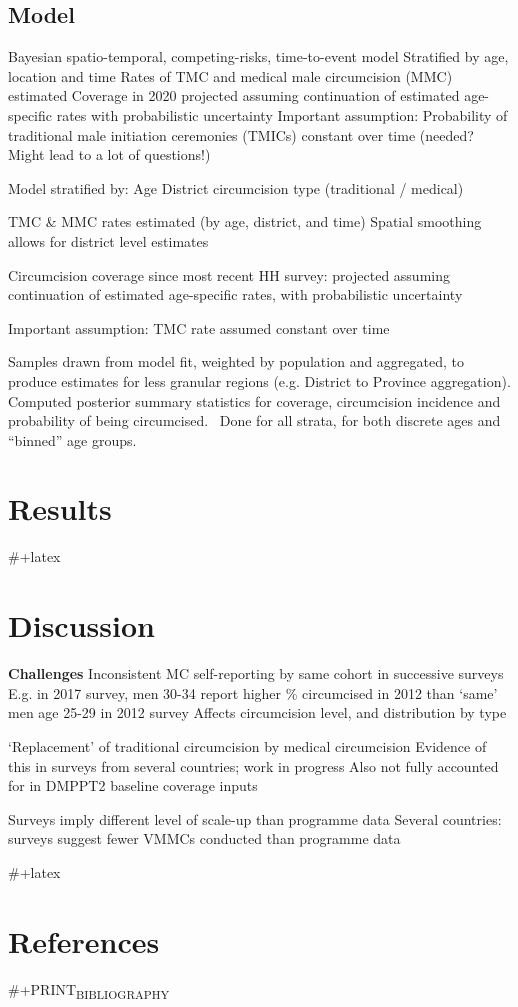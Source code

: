 \documentclass[a4paper, 12pt]{article}
\begin{document}
\subsection{Model}
\label{sec:org2077286}

Bayesian spatio-temporal, competing-risks, time-to-event model
Stratified by age, location and time
Rates of TMC and medical male circumcision (MMC) estimated
Coverage in 2020 projected assuming continuation of estimated age-specific rates with probabilistic uncertainty
Important assumption: Probability of traditional male initiation ceremonies (TMICs) constant over time (needed? Might lead to a lot of questions!) 

Model stratified by:
Age
District
circumcision type (traditional / medical)

TMC \& MMC rates estimated (by age, district, and time)
Spatial smoothing allows for district level estimates

Circumcision coverage since most recent HH survey: projected assuming continuation of estimated age-specific rates, with probabilistic uncertainty

Important assumption: TMC rate assumed constant over time


\newpage

Samples drawn from model fit, weighted by population and aggregated, to produce estimates for less granular regions (e.g. District to Province aggregation).
Computed posterior summary statistics for coverage, circumcision incidence and probability of being circumcised. 
Done for all strata, for both discrete ages and “binned” age groups.



\section{Results}
\label{sec:org634cf32}

\#+latex \newpage

\section{Discussion}
\label{sec:orgce42292}

\textbf{Challenges}
Inconsistent MC self-reporting by same cohort in successive surveys
E.g. in 2017 survey, men 30-34 report higher \% circumcised in 2012 than ‘same’ men age 25-29 in 2012 survey
Affects circumcision level, and distribution by type

‘Replacement’ of traditional circumcision by medical circumcision
Evidence of this in surveys from several countries; work in progress
Also not fully accounted for in DMPPT2 baseline coverage inputs

Surveys imply different level of scale-up than programme data
Several countries: surveys suggest fewer VMMCs conducted than programme data

\#+latex \newpage

\section{References}
\label{sec:org38b7f8b}

\#+PRINT\textsubscript{BIBLIOGRAPHY}
\end{document}
